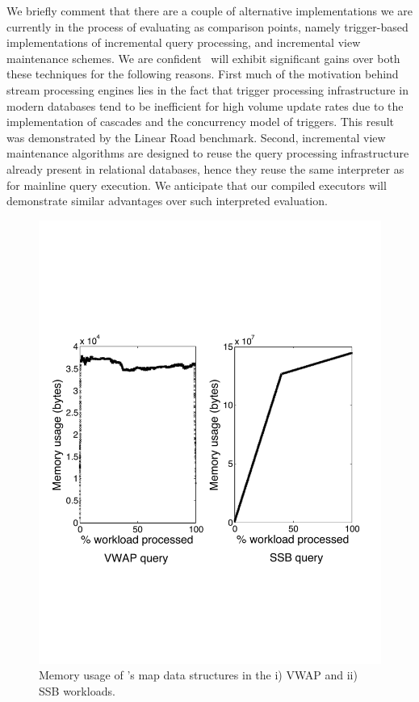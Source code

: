 We briefly comment that there are a couple of alternative implementations we
are currently in the process of evaluating as comparison points, namely
trigger-based implementations of incremental query processing, and incremental
view maintenance schemes. We are confident \compiler\ will exhibit significant
gains over both these techniques for the following reasons. First much of the
motivation behind stream processing engines lies in the fact that trigger
processing infrastructure in modern databases tend to be inefficient for
high volume update rates due to the implementation of cascades and the
concurrency model of triggers. This result was demonstrated by the Linear Road
benchmark. Second, incremental view maintenance algorithms are designed to
reuse the query processing infrastructure already present in relational
databases, hence they reuse the same interpreter as for mainline query
execution. We anticipate that our compiled executors will demonstrate
similar advantages over such interpreted evaluation.

\begin{figure}[h]
\begin{center}
\includegraphics[scale=0.3]{../plots/mem_usage}
\end{center}
\vspace{-4mm}
\caption{Memory usage of \compiler's map data structures in the i)
VWAP and ii) SSB workloads.}
\label{fig:memusage}
\end{figure}


